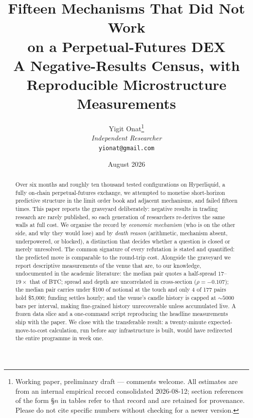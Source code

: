 \documentclass[11pt,a4paper]{article}
\begin{document}

\title{\textbf{Fifteen Mechanisms That Did Not Work\\[3pt]
on a Perpetual-Futures DEX}\\[6pt]
\large A Negative-Results Census, with Reproducible
Microstructure Measurements}

\author{Yigit Onat\thanks{Working paper, preliminary draft --- comments
welcome. All estimates are from an internal empirical record
consolidated 2026-08-12; section references of the form \S$n$ in tables
refer to that record and are retained for provenance. Please do not
cite specific numbers without checking for a newer version.}\\
\textit{Independent Researcher}\\
\texttt{yionat@gmail.com}}
\date{August 2026}
\maketitle

\begin{abstract}
Over six months and roughly ten thousand tested configurations on
Hyperliquid, a fully on-chain perpetual-futures exchange, we attempted
to monetise short-horizon predictive structure in the limit order book
and adjacent mechanisms, and failed fifteen times. This paper reports
the graveyard deliberately: negative results in trading research are
rarely published, so each generation of researchers re-derives the same
walls at full cost. We organise the record by \emph{economic mechanism}
(who is on the other side, and why they would lose) and by \emph{death
reason} (arithmetic, mechanism absent, underpowered, or blocked), a
distinction that decides whether a question is closed or merely
unresolved. The common signature of every refutation is stated and
quantified: the predicted move is comparable to the round-trip cost.
Alongside the graveyard we report descriptive measurements of the venue
that are, to our knowledge, undocumented in the academic literature:
the median pair quotes a half-spread $17$--$19\times$ that of BTC;
spread and depth are uncorrelated in cross-section ($\rho=-0.107$); the
median pair carries under \$100 of notional at the touch and only 4 of
177 pairs hold \$5{,}000; funding settles hourly; and the venue's
candle history is capped at ${\sim}5000$ bars per interval, making
fine-grained history unrecoverable unless accumulated live. A frozen
data slice and a one-command script reproducing the headline
measurements ship with the paper. We close with the transferable
result: a twenty-minute expected-move-to-cost calculation, run before
any infrastructure is built, would have redirected the entire programme
in week one.
\end{abstract}
\end{document}
